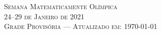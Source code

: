 \documentclass[11pt]{article} %
\begin{document}
\pagestyle{empty} %

\setlength{\parindent}{0pt} %




\hspace{0pt}\vfill

\begin{center}
	\textsc{\LARGE Semana Matematicamente Olímpica}\\ %
	\textsc{\large 24--29 de Janeiro de 2021}\\ %
	\textsc{Grade Provisória --- Atualizado em: \today} %
\end{center}

\end{document}
